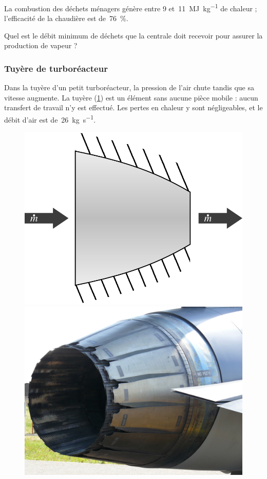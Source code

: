 	La combustion des déchets ménagers génère entre \num{9} et~\SI{11}{\mega\joule\per\kilogram} de chaleur ; l’efficacité de la chaudière est de~\SI{76}{\percent}.
	
	Quel est le débit minimum de déchets que la centrale doit recevoir pour assurer la production de vapeur ?
	

\subsubsection{Tuyère de turboréacteur}
\label{exo_tuyere_turboreacteur}

	Dans la tuyère d’un petit turboréacteur, la pression de l’air chute tandis que sa vitesse augmente. La tuyère (\cref{fig_nozzle}) est un élément sans aucune pièce mobile : aucun transfert de travail n’y est effectué. Les pertes en chaleur y sont négligeables, et le débit d’air est de~\SI{26}{\kilogram\per\second}. 

	\begin{figure}
		\begin{center}
			\includegraphics[height=0.35\textwidth, max height=0.5\columnwidth]{images/symbole_tuyere.png}
			\hspace{0.3cm}
			\includegraphics[height=0.35\textwidth, max height=0.5\columnwidth]{images/nozzle_f100.jpg}
		\end{center}
		\label{fig_nozzle}
	\end{figure}

